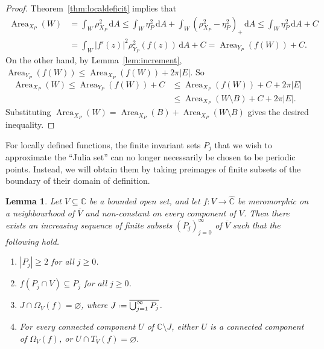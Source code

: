 \documentclass[12pt,a4paper,reqno]{amsart}
\newcommand{\Area}{\operatorname{Area}}
\theoremstyle{plain}
\newtheorem{lem}[thm]{Lemma}
\newcommand{\dA}{\mathrm dA}
\renewcommand{\subset}{\subseteq}
\theoremstyle{definition}
\theoremstyle{remark}
\numberwithin{equation}{section}
\newcommand \C{\mathbb{C}}
\newcommand*{\defeq}{\mathrel{\vcenter{\baselineskip0.5ex \lineskiplimit0pt
                     \hbox{\scriptsize.}\hbox{\scriptsize.}}}%
                     =}
\begin{document}
\begin{proof}
    Theorem~\ref{thm:localdeficit} implies that
\begin{align*}
    \Area_{X_P}(W)
    &= \int_W \rho_{X_P}^2\,\dA \leq \int_W \eta_{P}^2\,\dA + \int_W (\rho_{X_P}^2 - \eta_P^2)_+\,\dA  
    \leq \int_W \eta_P^2\,\dA + C \\
    &= \int_W |f'(z)|^2 \rho_{Y_P}^2(f(z))\,\dA + C 
    = \Area_{Y_P}(f(W)) + C.
\end{align*}
On the other hand, by Lemma~\ref{lem:increment},
$\Area_{Y_P}(f(W)) \leq \Area_{X_P}(f(W)) + 2\pi|E|$. So
\begin{align*}
    \Area_{X_P}(W)
    \leq \Area_{Y_P}(f(W)) + C 
    &\leq \Area_{X_P}(f(W)) + C + 2\pi|E| \\
    &\leq \Area_{X_P}(W \setminus B) + C + 2\pi|E|.
\end{align*}
Substituting $\Area_{X_P}(W) = \Area_{X_P}(B) + \Area_{X_P}(W \setminus B)$ gives the desired inequality.
\end{proof}

For locally defined functions, the finite invariant sets 
 $P_j$ that we wish to approximate the ``Julia set''
 can no longer necessarily be chosen to be periodic points.
 Instead, we will obtain them by taking preimages 
 of finite subsets of the boundary of their domain
 of definition. 

\begin{lem}\label{lem:sets p_j}
    Let $V \subset \C$ be a bounded open set, and let $f \colon V \to \widehat{\C}$ be meromorphic on a neighbourhood of $\overline{V}$ and non-constant on every component of $V$. Then there exists an increasing sequence of finite subsets $(P_j)_{j=0}^{\infty}$ 
    of $\overline{V}$ such that the following hold. 
    \begin{enumerate}[(1)]
        \item\label{item:atleast2} $|P_j| \geq 2$ for all $j\geq 0$.
        \item\label{item:invariance} $f(P_j \cap V) \subset P_j$ for all
        $j\geq 0$.
        \item\label{item:julia} $J\cap \Omega_V(f)=\varnothing$, where
         $J\defeq \overline{\bigcup_{j=1}^\infty P_j}$.
         \item\label{item:conn_comp} For every connected 
        component $U$ of $\C\setminus J$, 
        either $U$ is a connected component 
        of $\Omega_V(f)$, or $U\cap T_V(f)=\varnothing$.
    \end{enumerate}
\end{lem}
\end{document}
